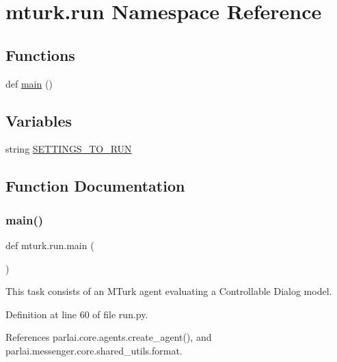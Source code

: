 \hypertarget{namespacemturk_1_1run}{}\section{mturk.\+run Namespace Reference}
\label{namespacemturk_1_1run}
\subsection*{Functions}
\begin{DoxyCompactItemize}
\item 
def \hyperlink{namespacemturk_1_1run_a742d6dfa1609938f250301a87485462a}{main} ()
\end{DoxyCompactItemize}
\subsection*{Variables}
\begin{DoxyCompactItemize}
\item 
string \hyperlink{namespacemturk_1_1run_a11d1a35eaa86c09de7a36ceb7e524374}{S\+E\+T\+T\+I\+N\+G\+S\+\_\+\+T\+O\+\_\+\+R\+UN}
\end{DoxyCompactItemize}


\subsection{Function Documentation}
\mbox{\label{namespacemturk_1_1run_a742d6dfa1609938f250301a87485462a}} 
\subsubsection{\texorpdfstring{main()}{main()}}
{\footnotesize\ttfamily def mturk.\+run.\+main (\begin{DoxyParamCaption}{ }\end{DoxyParamCaption})}

\begin{DoxyVerb}This task consists of an MTurk agent evaluating a Controllable Dialog model.
\end{DoxyVerb}
 

Definition at line 60 of file run.\+py.



References parlai.\+core.\+agents.\+create\+\_\+agent(), and parlai.\+messenger.\+core.\+shared\+\_\+utils.\+format.

